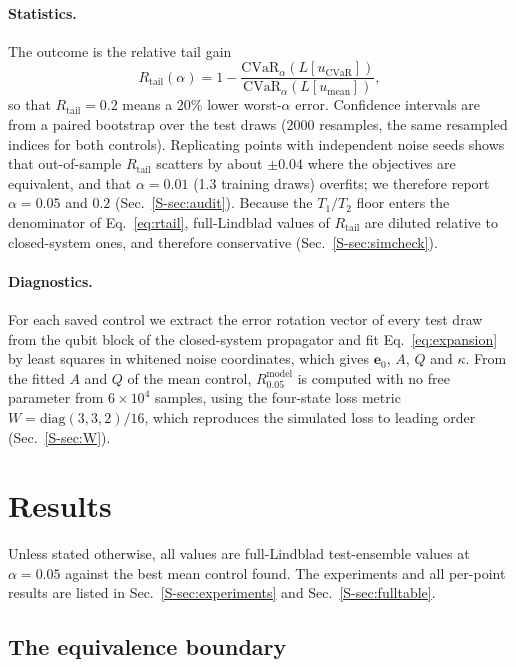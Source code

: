 \documentclass[aps,pra,twocolumn,superscriptaddress,reprint,nofootinbib,floatfix]{revtex4-2}
\theoremstyle{definition}
\newcommand{\cvar}{\mathrm{CVaR}}
\newcommand{\Rt}{R_{\mathrm{tail}}}
\newcommand{\Rm}{R^{\mathrm{model}}}
\newcommand{\umean}{u_{\mathrm{mean}}}
\newcommand{\ucvar}{u_{\cvar}}
\newcommand{\sref}[1]{Sec.~\ref{S-#1}}
\begin{document}
\paragraph*{Statistics.} The outcome is the relative tail gain
\begin{equation}
\Rt(\alpha)=1-\frac{\cvar_\alpha(L[\ucvar])}{\cvar_\alpha(L[\umean])},
\label{eq:rtail}
\end{equation}
so that $\Rt=0.2$ means a 20\% lower worst-$\alpha$ error. Confidence
intervals are from a paired bootstrap over the test draws \cite{Efron1993}
(2000 resamples, the same resampled indices for both controls). Replicating
points with independent noise seeds shows that out-of-sample $\Rt$ scatters
by about $\pm0.04$ where the objectives are equivalent, and that
$\alpha=0.01$ (1.3 training draws) overfits; we therefore report
$\alpha=0.05$ and $0.2$ (\sref{sec:audit}). Because the $T_1/T_2$ floor enters
the denominator of Eq.~\eqref{eq:rtail}, full-Lindblad values of $\Rt$ are
diluted relative to closed-system ones, and therefore conservative
(\sref{sec:simcheck}).

\paragraph*{Diagnostics.} For each saved control we extract the error rotation
vector of every test draw from the qubit block of the closed-system
propagator and fit Eq.~\eqref{eq:expansion} by least squares in whitened
noise coordinates, which gives $\mathbf e_0$, $A$, $Q$ and $\kappa$. From the
fitted $A$ and $Q$ of the mean control, $\Rm_{0.05}$ is computed with no free
parameter from $6\times10^4$ samples, using the four-state loss metric
$W=\mathrm{diag}(3,3,2)/16$, which reproduces the simulated loss to leading
order (\sref{sec:W}).

\section{Results}
\label{sec:results}

Unless stated otherwise, all values are full-Lindblad test-ensemble values
at $\alpha=0.05$ against the best mean control found. The experiments and
all per-point results are listed in \sref{sec:experiments} and
\sref{sec:fulltable}.

\subsection{The equivalence boundary}
\label{sec:equiv}
\end{document}
